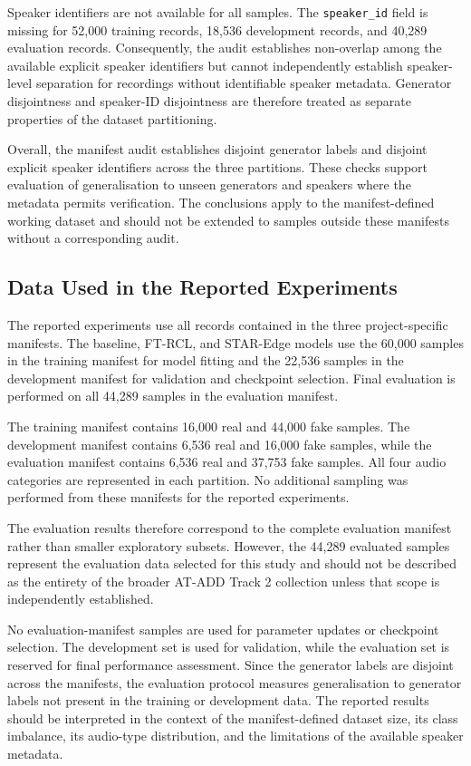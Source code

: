 Speaker identifiers are not available for all samples. The \texttt{speaker\_id} field is missing for 52,000 training records, 18,536 development records, and 40,289 evaluation records. Consequently, the audit establishes non-overlap among the available explicit speaker identifiers but cannot independently establish speaker-level separation for recordings without identifiable speaker metadata. Generator disjointness and speaker-ID disjointness are therefore treated as separate properties of the dataset partitioning.

Overall, the manifest audit establishes disjoint generator labels and disjoint explicit speaker identifiers across the three partitions. These checks support evaluation of generalisation to unseen generators and speakers where the metadata permits verification. The conclusions apply to the manifest-defined working dataset and should not be extended to samples outside these manifests without a corresponding audit.

\subsection{Data Used in the Reported Experiments}
\label{sec:data-used}

The reported experiments use all records contained in the three project-specific manifests. The baseline, FT-RCL, and STAR-Edge models use the 60,000 samples in the training manifest for model fitting and the 22,536 samples in the development manifest for validation and checkpoint selection. Final evaluation is performed on all 44,289 samples in the evaluation manifest.

The training manifest contains 16,000 real and 44,000 fake samples. The development manifest contains 6,536 real and 16,000 fake samples, while the evaluation manifest contains 6,536 real and 37,753 fake samples. All four audio categories are represented in each partition. No additional sampling was performed from these manifests for the reported experiments.

The evaluation results therefore correspond to the complete evaluation manifest rather than smaller exploratory subsets. However, the 44,289 evaluated samples represent the evaluation data selected for this study and should not be described as the entirety of the broader AT-ADD Track 2 collection unless that scope is independently established.

No evaluation-manifest samples are used for parameter updates or checkpoint selection. The development set is used for validation, while the evaluation set is reserved for final performance assessment. Since the generator labels are disjoint across the manifests, the evaluation protocol measures generalisation to generator labels not present in the training or development data. The reported results should be interpreted in the context of the manifest-defined dataset size, its class imbalance, its audio-type distribution, and the limitations of the available speaker metadata.

